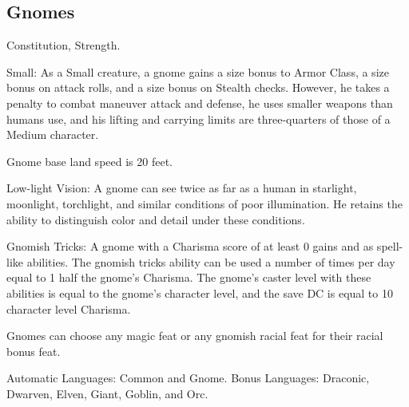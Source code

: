 \subsection{Gnomes}
\begin{itemize*}
\item {} Constitution,  Strength.
\item Small: As a Small creature, a gnome gains a  size bonus to Armor Class, a  size bonus on attack rolls, and a  size bonus on Stealth checks. However, he takes a  penalty to combat maneuver attack and defense, he uses smaller weapons than humans use, and his lifting and carrying limits are three-quarters of those of a Medium character.
\item Gnome base land speed is 20 feet.
\item Low-light Vision: A gnome can see twice as far as a human in starlight, moonlight, torchlight, and similar conditions of poor illumination. He retains the ability to distinguish color and detail under these conditions.
\item Gnomish Tricks: A gnome with a Charisma score of at least 0 gains  and  as spell-like abilities. The gnomish tricks ability can be used a number of times per day equal to 1 \add half the gnome's Charisma. The gnome's caster level with these abilities is equal to the gnome's character level, and the save DC is equal to 10 \add character level \add Charisma.

\item Gnomes can choose any magic feat or any gnomish racial feat for their racial bonus feat.
\item Automatic Languages: Common and Gnome. Bonus Languages: Draconic, Dwarven, Elven, Giant, Goblin, and Orc.
\end{itemize*}

